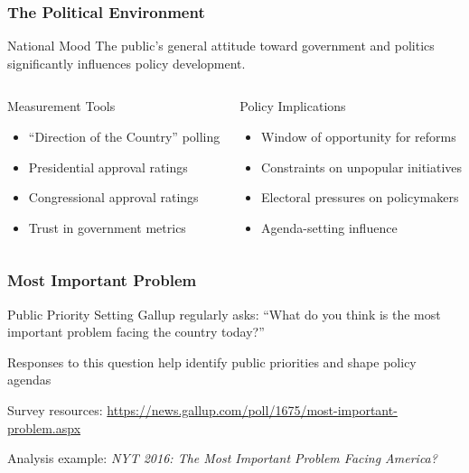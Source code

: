 \documentclass[10pt]{beamer}
\begin{document}
\begin{frame}
\frametitle{The Political Environment}

\begin{block}{National Mood}
The public's general attitude toward government and politics significantly influences policy development.
\end{block}

\vspace{0.5cm}

\begin{columns}
\begin{column}{0.48\textwidth}
\begin{block}{Measurement Tools}
\pause
\begin{itemize}
\item ``Direction of the Country'' polling
\item Presidential approval ratings
\item Congressional approval ratings
\item Trust in government metrics
\end{itemize}
\end{block}
\end{column}

\begin{column}{0.48\textwidth}
\begin{block}{Policy Implications}
\pause
\begin{itemize}
\item Window of opportunity for reforms
\item Constraints on unpopular initiatives
\item Electoral pressures on policymakers
\item Agenda-setting influence
\end{itemize}
\end{block}
\end{column}
\end{columns}

\end{frame}

\begin{frame}
\frametitle{Most Important Problem}

\begin{block}{Public Priority Setting}
Gallup regularly asks: ``What do you think is the most important problem facing the country today?''
\end{block}

\pause
\vspace{0.5cm}

Responses to this question help identify public priorities and shape policy agendas

\vspace{1cm}

\centering
\small
Survey resources: \url{https://news.gallup.com/poll/1675/most-important-problem.aspx}

Analysis example: \textit{NYT 2016: The Most Important Problem Facing America?}

\end{frame}
\end{document}
